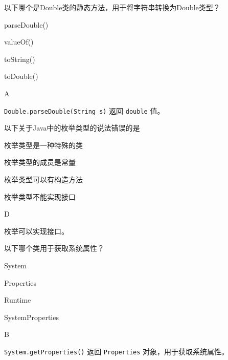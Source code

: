 \begin{question}
	以下哪个是Double类的静态方法，用于将字符串转换为Double类型？
	\begin{options}
		\item parseDouble()
		\item valueOf()
		\item toString()
		\item toDouble()
	\end{options}
	\begin{answer}
		A
	\end{answer}
	\begin{explanation}
		\texttt{Double.parseDouble(String s)} 返回 \texttt{double} 值。
	\end{explanation}
\end{question}

\begin{question}
	以下关于Java中的枚举类型的说法错误的是
	\begin{options}
		\item 枚举类型是一种特殊的类
		\item 枚举类型的成员是常量
		\item 枚举类型可以有构造方法
		\item 枚举类型不能实现接口
	\end{options}
	\begin{answer}
		D
	\end{answer}
	\begin{explanation}
		枚举可以实现接口。
	\end{explanation}
\end{question}

\begin{question}
	以下哪个类用于获取系统属性？
	\begin{options}
		\item System
		\item Properties
		\item Runtime
		\item SystemProperties
	\end{options}
	\begin{answer}
		B
	\end{answer}
	\begin{explanation}
		\texttt{System.getProperties()} 返回 \texttt{Properties} 对象，用于获取系统属性。
	\end{explanation}
\end{question}

